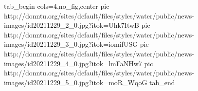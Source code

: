  
 
 
 
 

\ifcmt
  tab_begin cols=4,no_fig,center
     pic http://donntu.org/sites/default/files/styles/water/public/news-images/id20211229_2_0.jpg?itok=Uhk7ItwB
		 pic http://donntu.org/sites/default/files/styles/water/public/news-images/id20211229_3_0.jpg?itok=iomifUSG
		 pic http://donntu.org/sites/default/files/styles/water/public/news-images/id20211229_4_0.jpg?itok=lmFaNHw7
		 pic http://donntu.org/sites/default/files/styles/water/public/news-images/id20211229_5_0.jpg?itok=moR_WqoG
  tab_end
\fi
